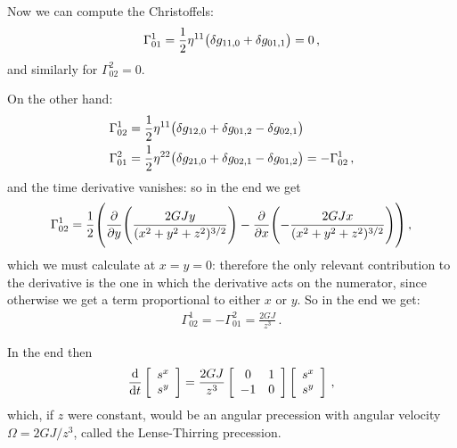 \documentclass[main.tex]{subfiles}
\begin{document}
Now we can compute the Christoffels: 
%
\begin{align}
  \Gamma^{1}_{01} = \frac{1}{2} \eta^{11} \qty(
      \delta g_{11, 0} + \delta g_{01, 1}
  ) = 0
\,,
\end{align}
%
and similarly for \(\Gamma^{2}_{02}=0\). 

On the other hand: 
%
\begin{subequations}
\begin{align}
  \Gamma^{1}_{02} &= \frac{1}{2} \eta^{11} \qty(
      \delta g_{12, 0} + \delta g_{01, 2} 
      - \delta g_{02, 1}
  ) \\
  \Gamma^{2}_{01} &= \frac{1}{2} \eta^{22} \qty(
    \delta g_{21, 0} + \delta g_{02, 1} 
    - \delta g_{01, 2}
) = - \Gamma^{1}_{02}
\,,
\end{align}
\end{subequations}
%
and the time derivative vanishes: so in the end we get 
%
\begin{align}
  \Gamma^{1}_{02} = \frac{1}{2} \qty(\pdv{}{y} \qty(\frac{2GJy}{(x^2+y^2+z^2)^{3/2}}) - \pdv{}{x} \qty(- \frac{2GJx}{(x^2+y^2+z^2)^{3/2}}))
\,,
\end{align}
%
which we must calculate at \(x=y=0\): therefore the only relevant contribution to the derivative is the one in which the derivative acts on the numerator, since otherwise we get a term proportional to either \(x\) or \(y\). So in the end we get: 
%
\begin{align}
  \Gamma^{1}_{02} = - \Gamma^{2}_{01} = \frac{2GJ}{z^3}
\,.
\end{align}

In the end then 
%
\begin{subequations}
\begin{align}
  \dv{}{t} \left[\begin{array}{c}
  s^{x} \\ 
  s^{y}
  \end{array}\right] =
  \frac{2GJ}{z^3}
  \left[\begin{array}{cc}
  0 & 1 \\ 
  -1 & 0
  \end{array}\right]
  \left[\begin{array}{c}
    s^{x} \\ 
    s^{y}
\end{array}\right]
\,,
\end{align}
\end{subequations}
%
which, if \(z\) were constant, would be an angular precession with angular velocity \(\Omega = 2GJ/z^3\), called the Lense-Thirring precession. 
\end{document}
